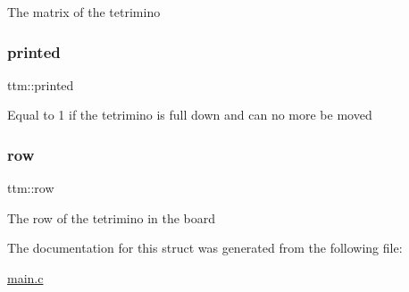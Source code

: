The matrix of the tetrimino \mbox{\label{structttm_a576f3b3a777fd0b70e06e8a988fbce00}} 
\subsubsection{\texorpdfstring{printed}{printed}}
{\footnotesize\ttfamily ttm\+::printed}

Equal to 1 if the tetrimino is full down and can no more be moved \mbox{\label{structttm_ad31396b959fc09891926ea70dac0a985}} 
\subsubsection{\texorpdfstring{row}{row}}
{\footnotesize\ttfamily ttm\+::row}

The row of the tetrimino in the board 

The documentation for this struct was generated from the following file\+:\begin{DoxyCompactItemize}
\item 
\hyperlink{main_8c}{main.\+c}\end{DoxyCompactItemize}
